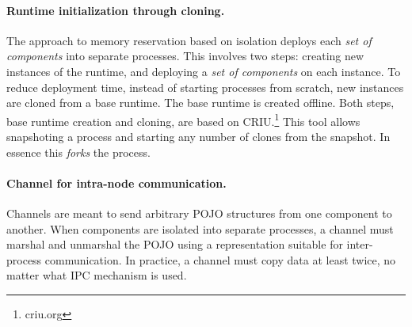 %

\paragraph{Runtime initialization through cloning.}
The approach to memory reservation based on isolation deploys each \textit{set of components} into separate processes.
This involves two steps: creating new instances of the runtime, and deploying a \textit{set of components} on each instance.
To reduce deployment time, instead of starting processes from scratch,
new instances are cloned from a base runtime.
The base runtime is created offline. %
Both steps, base runtime creation and cloning, are based on CRIU.\footnote{criu.org}
This tool allows snapshoting a process and starting any number of clones from the snapshot.
In essence this \textit{forks} the process.


\paragraph{Channel for intra-node communication.}
Channels are meant to send arbitrary POJO structures from one component to another.
When components are isolated into separate processes,
a channel must marshal and unmarshal the POJO using a representation suitable for inter-process communication.
In practice, a channel must copy data at least twice, no matter what IPC mechanism is used.

